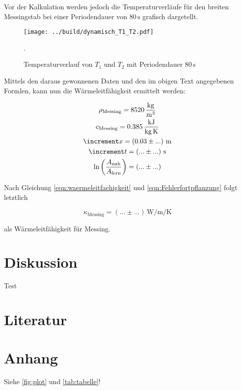 Vor der Kalkulation werden jedoch die Temperaturverläufe für den breiten Messingstab bei einer Periodendauer von 80\,$\unit{\second}$ grafisch dargetellt.

\begin{figure}
  \centering
  \texttt{[image: ../build/dynamisch\_T1\_T2.pdf]}
  \caption{Temperaturverlauf von $T_1$ und $T_2$ mit Periodendauer 80\,\unit{\second}}.
  \label{fig:dynamisch1}
\end{figure}

Mittels den daraus gewonnenen Daten und den im obigen Text angegebenen Formlen, kann nun die Wärmeleitfähigkeit ermittelt werden:

\begin{gather*}
  \rho_\text{Messing} = 8520\,\unit[per-mode=fraction]{\kilo\gram\per\cubic\meter} \\
  c_\text{Messing} = 0.385\,\unit{\kilo\joule\per\kilo\gram\per\kelvin} \\
  \increment x = \left(0.03\pm...\right)\,\unit{\meter} \\
  \increment t = \left(...\pm...\right)\,\unit{\second} \\
  \ln\left(\frac{A_\text{nah}}{A_\text{fern}}\right) = \left(...\pm...\right)\\
\end{gather*}

Nach Gleichung \eqref{eqn:waermeleitfaehigkeit} und \eqref{eqn:Fehlerfortpflanzung} folgt letztlich

\begin{equation}
  \kappa_\text{Messing} = \left(...\pm...\right)\,\unit{\watt\per\meter\per\kelvin}
\end{equation}

als Wärmeleitfähigkeit für Messing.

\section{Diskussion}
Test
\section{Literatur}

\section{Anhang}
Siehe \autoref{fig:plot} und \autoref{tab:tabelle}!


